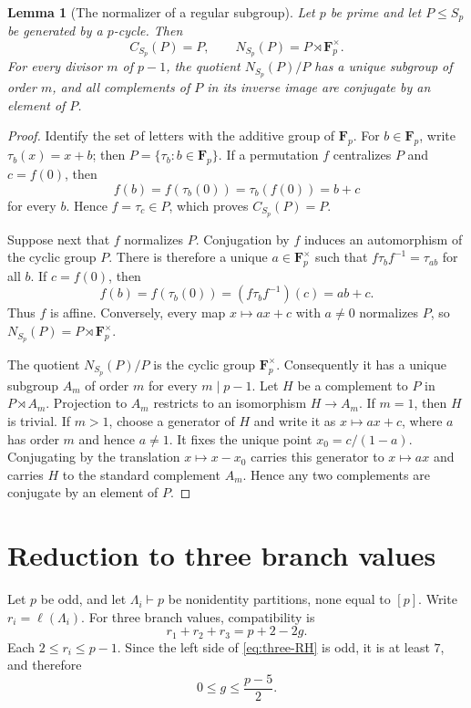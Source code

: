 \documentclass[10pt,a4paper]{amsart}
\newtheorem{lemma}[theorem]{Lemma}
\newcommand{\length}{\ell}
\numberwithin{equation}{section}
\begin{document}
\begin{lemma}[The normalizer of a regular subgroup]\label{lem:normalizer}
Let $p$ be prime and let $P\leq S_p$ be generated by a $p$-cycle.  Then
\[
 C_{S_p}(P)=P,\qquad
 N_{S_p}(P)=P\rtimes\mathbf F_p^\times.
\]
For every divisor $m$ of $p-1$, the quotient
$N_{S_p}(P)/P$ has a unique subgroup of order $m$, and all complements of
$P$ in its inverse image are conjugate by an element of $P$.
\end{lemma}

\begin{proof}
Identify the set of letters with the additive group of $\mathbf F_p$.  For
$b\in\mathbf F_p$, write $\tau_b(x)=x+b$; then
$P=\{\tau_b:b\in\mathbf F_p\}$.  If a permutation $f$ centralizes $P$ and
$c=f(0)$, then
\[
 f(b)=f(\tau_b(0))=\tau_b(f(0))=b+c
\]
for every $b$.  Hence $f=\tau_c\in P$, which proves $C_{S_p}(P)=P$.

Suppose next that $f$ normalizes $P$.  Conjugation by $f$ induces an
automorphism of the cyclic group $P$.  There is therefore a unique
$a\in\mathbf F_p^\times$ such that
$f\tau_bf^{-1}=\tau_{ab}$ for all $b$.  If $c=f(0)$, then
\[
 f(b)=f(\tau_b(0))=(f\tau_bf^{-1})(c)=ab+c.
\]
Thus $f$ is affine.  Conversely, every map $x\mapsto ax+c$ with
$a\ne0$ normalizes $P$, so
$N_{S_p}(P)=P\rtimes\mathbf F_p^\times$.

The quotient $N_{S_p}(P)/P$ is the cyclic group $\mathbf F_p^\times$.
Consequently it has a unique subgroup $A_m$ of order $m$ for every
$m\mid p-1$.  Let $H$ be a complement to $P$ in $P\rtimes A_m$.  Projection
to $A_m$ restricts to an isomorphism $H\to A_m$.  If $m=1$, then $H$ is
trivial.  If $m>1$, choose a generator of $H$ and write it as
$x\mapsto ax+c$, where $a$ has order $m$ and hence $a\ne1$.  It fixes the
unique point $x_0=c/(1-a)$.  Conjugating by the translation
$x\mapsto x-x_0$ carries this generator to $x\mapsto ax$ and carries $H$ to
the standard complement $A_m$.  Hence any two complements are conjugate by
an element of $P$.
\end{proof}

\section{Reduction to three branch values}\label{sec:EKS-reduction}

Let $p$ be odd, and let $\Lambda_i\vdash p$ be nonidentity partitions,
none equal to $[p]$.  Write $r_i=\length(\Lambda_i)$.  For three branch
values, compatibility is
\begin{equation}\label{eq:three-RH}
 r_1+r_2+r_3=p+2-2g.
\end{equation}
Each $2\leq r_i\leq p-1$.  Since the left side of
\eqref{eq:three-RH} is odd, it is at least $7$, and therefore
\begin{equation}\label{eq:genus-bound}
 0\leq g\leq \frac{p-5}{2}.
\end{equation}
\end{document}
